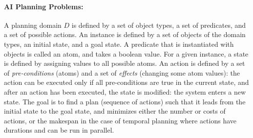 \documentclass{llncs}
\begin{document}
\paragraph{AI Planning Problems:} A planning domain $D$ is defined by a set of object types, a set of predicates, and a set of possible actions. An instance is defined by a set of objects of the domain types, an initial state, and a goal state. A predicate that is instantiated with objects is called an atom, and takes a boolean value. For a given instance, a state is defined by assigning values to all possible atoms. An action is defined by a set of {\em pre-conditions} (atoms) and a set of {\em effects} (changing some atom values): the action can be executed only if all pre-conditions are true in the current state, and after an action has been executed, the state is modified: the system enters a new state. The goal is to find a plan (sequence of actions) such that it leads from the initial state to the goal state, and minimizes either the number or costs of actions, or the makespan in the case of temporal planning where actions have durations and can be run in parallel.
\end{document}
